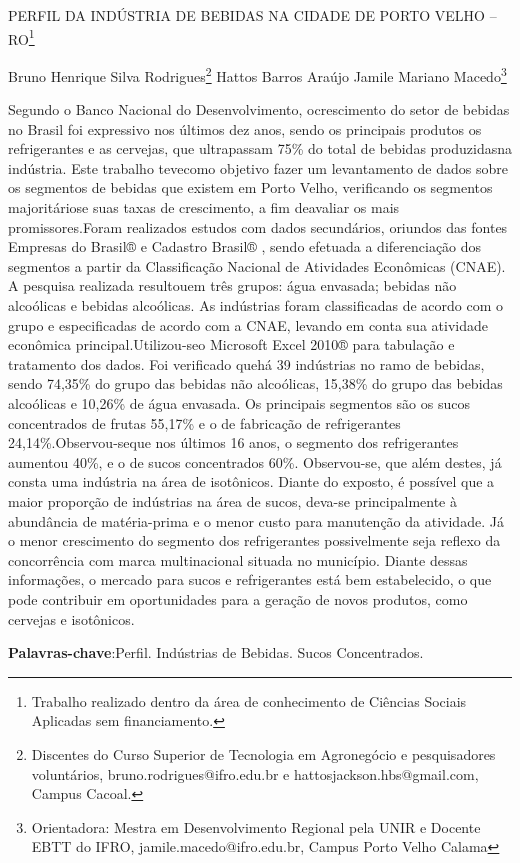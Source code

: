 \documentclass[article,12pt,onesidea,4paper,english,brazil]{abntex2}
\begin{document}
	
	
	\frenchspacing 
	
	\begin{center}
		\LARGE PERFIL DA INDÚSTRIA DE BEBIDAS NA CIDADE DE PORTO VELHO – RO\footnote{Trabalho realizado dentro da área de conhecimento de Ciências Sociais Aplicadas sem
			financiamento.}
		
		\normalsize
		Bruno Henrique Silva Rodrigues\footnote{Discentes do Curso Superior de Tecnologia em Agronegócio e pesquisadores voluntários,
			bruno.rodrigues@ifro.edu.br e hattosjackson.hbs@gmail.com, Campus Cacoal.} 
		Hattos Barros Araújo
		Jamile Mariano Macedo\footnote{Orientadora: Mestra em Desenvolvimento Regional pela UNIR e Docente EBTT do IFRO,
			jamile.macedo@ifro.edu.br, Campus Porto Velho Calama} 
		
	\end{center}
	
	\noindent Segundo o Banco Nacional do Desenvolvimento, ocrescimento do setor de bebidas
	no Brasil foi expressivo nos últimos dez anos, sendo os principais produtos os
	refrigerantes e as cervejas, que ultrapassam 75\% do total de bebidas produzidasna
	indústria. Este trabalho tevecomo objetivo fazer um levantamento de dados sobre os
	segmentos de bebidas que existem em Porto Velho, verificando os segmentos
	majoritáriose suas taxas de crescimento, a fim deavaliar os mais promissores.Foram
	realizados estudos com dados secundários, oriundos das fontes Empresas do
	Brasil®
	e Cadastro Brasil®
	, sendo efetuada a diferenciação dos segmentos a partir da
	Classificação Nacional de Atividades Econômicas (CNAE). A pesquisa realizada
	resultouem três grupos: água envasada; bebidas não alcoólicas e bebidas
	alcoólicas. As indústrias foram classificadas de acordo com o grupo e especificadas
	de acordo com a CNAE, levando em conta sua atividade econômica
	principal.Utilizou-seo Microsoft Excel 2010®
	para tabulação e tratamento dos dados.
	Foi verificado quehá 39 indústrias no ramo de bebidas, sendo 74,35\% do grupo das
	bebidas não alcoólicas, 15,38\% do grupo das bebidas alcoólicas e 10,26\% de água
	envasada. Os principais segmentos são os sucos concentrados de frutas 55,17\% e o
	de fabricação de refrigerantes 24,14\%.Observou-seque nos últimos 16 anos, o
	segmento dos refrigerantes aumentou 40\%, e o de sucos concentrados 60\%.
	Observou-se, que além destes, já consta uma indústria na área de isotônicos. Diante
	do exposto, é possível que a maior proporção de indústrias na área de sucos, deva-se principalmente à abundância de matéria-prima e o menor custo para manutenção
	da atividade. Já o menor crescimento do segmento dos refrigerantes possivelmente
	seja reflexo da concorrência com marca multinacional situada no município. Diante
	dessas informações, o mercado para sucos e refrigerantes está bem estabelecido, o
	que pode contribuir em oportunidades para a geração de novos produtos, como
	cervejas e isotônicos.
	
	\vspace{\onelineskip}
	
	\noindent
	\textbf{Palavras-chave}:Perfil. Indústrias de Bebidas. Sucos Concentrados.
	
\end{document}
